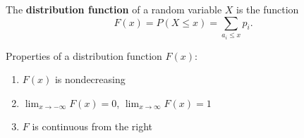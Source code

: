 The \textbf{distribution function} of a random variable $X$ is the function
$$F(x) = P(X \leq x) = \sum_{a_i \leq x} p_i.$$

Properties of a distribution function $F(x)$:
\begin{enumerate}
\item $F(x)$ is nondecreasing
\item $\lim_{x \to -\infty} F(x) = 0$, $\lim_{x \to \infty} F(x) = 1$
\item $F$ is continuous from the right
\end{enumerate}
